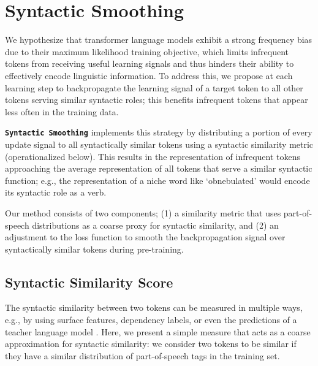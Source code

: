 \section{Syntactic Smoothing}

We hypothesize that transformer language models exhibit a strong frequency bias due to their maximum likelihood training objective, which limits infrequent tokens from receiving useful learning signals and thus hinders their ability to effectively encode linguistic information. To address this, we propose at each learning step to backpropagate the learning signal of a target token to all other tokens serving similar syntactic roles; this benefits infrequent tokens that appear less often in the training data.

\textbf{\texttt{Syntactic Smoothing}} implements this strategy by distributing a portion of every update signal to all syntactically similar tokens using a syntactic similarity metric (operationalized below). This results in the representation of infrequent tokens approaching the average representation of all tokens that serve a similar syntactic function; e.g., the representation of a niche word like `obnebulated' would encode its syntactic role as a verb.

Our method consists of two components; (1) a similarity metric that uses part-of-speech distributions as a coarse proxy for syntactic similarity, and (2) an adjustment to the loss function to smooth the backpropagation signal over syntactically similar tokens during pre-training. 

\subsection{Syntactic Similarity Score}\label{sec:sim}

The syntactic similarity between two tokens can be measured in multiple ways, e.g., by using surface features, dependency labels, or even the predictions of a teacher language model \citep{hinton2015distilling}. Here, we present a simple measure that acts as a coarse approximation for syntactic similarity: we consider two tokens to be similar if they have a similar distribution of part-of-speech tags in the training set.

